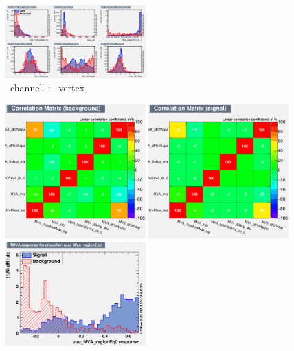 \begin{figure}[htbp]
	\includegraphics[width=0.48\textwidth]{6_Search/Figures/MVAtechnics/singletopzct/uue/variables_id_c1.png}
	\caption{\emumu\ channel. \STSR: \Zct\ vertex }
	\label{image:Figuresuuesingletopzct}
\end{figure}


\begin{figure}[htbp]
	\includegraphics[width=0.48\textwidth]{6_Search/Figures/MVAtechnics/singletopzct/uuu/CorrelationMatrixB.png}
	\includegraphics[width=0.48\textwidth]{6_Search/Figures/MVAtechnics/singletopzct/uuu/CorrelationMatrixS.png}
	\includegraphics[width=0.48\textwidth]{6_Search/Figures/MVAtechnics/singletopzct/uuu/mva_uuu_MVA_regionEq0.png}

\end{figure}

